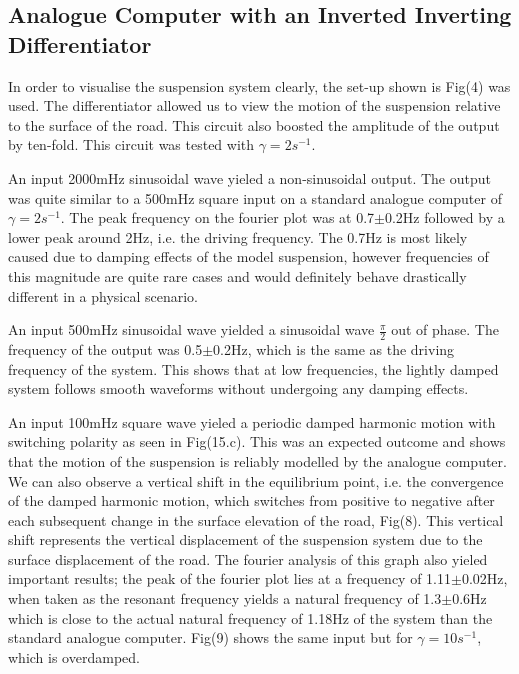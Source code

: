 \documentclass[journal]{Imperial_lab_report}
\begin{document}
    \subsection{Analogue Computer with an Inverted Inverting Differentiator}
    
    In order to visualise the suspension system clearly, the set-up shown is Fig(4) was used. The differentiator allowed us to view the motion of the suspension relative to the surface of the road. This circuit also boosted the amplitude of the output by ten-fold. This circuit was tested with $\gamma = 2$$s^{-1}$.

    An input 2000mHz sinusoidal wave yieled a non-sinusoidal output. The output was quite similar to a 500mHz square input on a standard analogue computer of $\gamma = 2$$s^{-1}$. The peak frequency on the fourier plot was at 0.7$\pm$0.2Hz followed by a lower peak around 2Hz, i.e. the driving frequency. The 0.7Hz is most likely caused due to damping effects of the model suspension, however frequencies of this magnitude are quite rare cases and would definitely behave drastically different in a physical scenario. 

    An input 500mHz sinusoidal wave yielded a sinusoidal wave $\frac{\pi}{2}$ out of phase. The frequency of the output was 0.5$\pm$0.2Hz, which is the same as the driving frequency of the system. This shows that at low frequencies, the lightly damped system follows smooth waveforms without undergoing any damping effects.

    An input 100mHz square wave yieled a periodic damped harmonic motion with switching polarity as seen in Fig(15.c). This was an expected outcome and shows that the motion of the suspension is reliably modelled by the analogue computer. We can also observe a vertical shift in the equilibrium point, i.e. the convergence of the damped harmonic motion, which switches from positive to negative after each subsequent change in the surface elevation of the road, Fig(8). This vertical shift represents the vertical displacement of the suspension system due to the surface displacement of the road. The fourier analysis of this graph also yieled important results; the peak of the fourier plot lies at a frequency of 1.11$\pm$0.02Hz, when taken as the resonant frequency yields a natural frequency of 1.3$\pm$0.6Hz which is close to the actual natural frequency of 1.18Hz of the system than the standard analogue computer. Fig(9) shows the same input but for $\gamma = 10$$s^{-1}$, which is overdamped.
\end{document}

